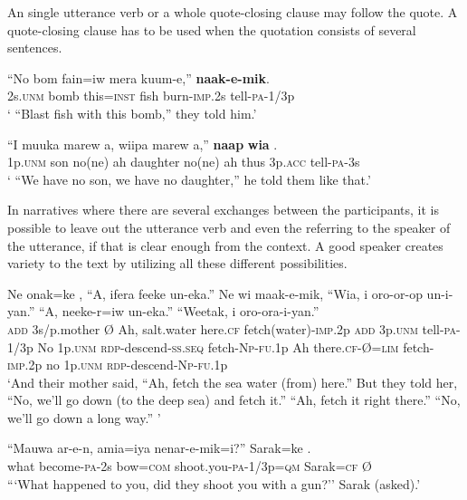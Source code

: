 An single utterance verb or a whole quote-closing clause may follow the quote. A quote-closing clause has to be used when the quotation consists of several sentences.

\ea%
\label{ex:8:x1580}
\gll ``No  bom  fain=iw  mera  kuum-e,''  \textbf{naak-e-mik}. \\
2s.\textsc{unm} bomb this=\textsc{inst} fish burn-\textsc{imp}.2s  tell-\textsc{pa}-1/3p\\
\glt` ``Blast fish with this bomb,'' they told him.'
\z


\ea%
\label{ex:8:x1583}
\gll ``I  muuka  marew  a,  wiipa  marew  a,''  \textbf{naap} \textbf{wia} .\\
1p.\textsc{unm} son  no(ne)  ah  daughter  no(ne)  ah  thus 3p.\textsc{acc} tell-\textsc{pa}-3s\\
\glt` ``We have no son, we have no daughter,'' he told them like that.'
\z


In narratives where there are several exchanges between the participants, it is possible to leave out the utterance verb and even the  referring to the speaker of the utterance, if that is clear enough from the context. A good speaker creates variety to the text by utilizing all these different possibilities. 

\ea%
\label{ex:8:x1581}
\gll Ne  onak=ke  \textstyleEmphasizedVernacularWords{{\O}},  ``A,  ifera  feeke  un-eka.'' Ne  wi  maak-e-mik,  ``Wia,  i  oro-or-op un-i-yan.''  ``A,  neeke-r=iw  un-eka.''  ``Weetak, i  oro-ora-i-yan.''\\
\textsc{add} 3s/p.mother  {\O}  Ah,  salt.water  here.\textsc{cf} fetch(water)-\textsc{imp}.2p \textsc{add} 3p.\textsc{unm} tell-\textsc{pa}-1/3p No  1p.\textsc{unm} \textsc{rdp}-descend-\textsc{ss}.\textsc{seq} fetch-\textsc{Np}-\textsc{fu}.1p Ah there.\textsc{cf}-{\O}=\textsc{lim} fetch-\textsc{imp}.2p no 1p.\textsc{unm} \textsc{rdp}-descend-\textsc{Np}-\textsc{fu}.1p\\
\glt`And their mother said, ``Ah, fetch the sea water (from) here.'' But they told her, ``No, we'll go down (to the deep sea) and fetch it.'' ``Ah, fetch it right there.'' ``No, we'll go down a long way.'' '
\z


\ea%
\label{ex:8:x1582}
\gll ``Mauwa ar-e-n, amia=iya nenar-e-mik=i?'' Sarak=ke \textstyleEmphasizedVernacularWords{{\O}}.\hspace{-1mm}\\
what become-\textsc{pa}-2s bow=\textsc{com} shoot.you-\textsc{pa}-1/3p=\textsc{qm} Sarak=\textsc{cf} {\O}\\
\glt```What happened to you, did they shoot you with a gun?'' Sarak (asked).'
\z


